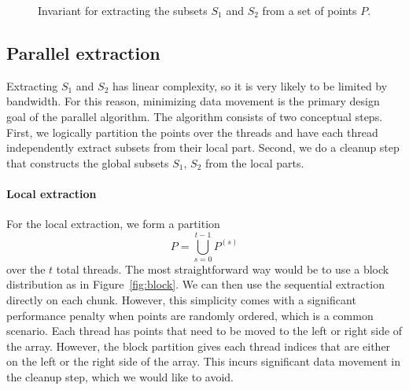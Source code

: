\documentclass[11pt,a4paper]{article}
\begin{document}
\begin{figure}[ht]
  \caption{Invariant for extracting the subsets $S_1$ and $S_2$ from a set of points $P$.}%
  \label{fig:invariant_qhull}%
\end{figure}

\subsection{Parallel extraction}
Extracting $S_1$ and $S_2$ has linear complexity, so it is very likely to be limited by bandwidth.
For this reason, minimizing data movement is the primary design goal of the parallel algorithm.
The algorithm consists of two conceptual steps.
First, we logically partition the points over the threads and have each thread independently extract subsets from their local part.
Second, we do a cleanup step that constructs the global subsets $S_1$, $S_2$ from the local parts.

\paragraph{Local extraction}
For the local extraction, we form a partition
\[
P = \bigcup\limits_{s = 0}^{t - 1} P^{(s)}
\]
over the $t$ total threads.
The most straightforward way would be to use a block distribution as in Figure~\ref{fig:block}.
We can then use the sequential extraction directly on each chunk.
However, this simplicity comes with a significant performance penalty when points are randomly ordered, which is a common scenario.
Each thread has points that need to be moved to the left or right side of the array.
However, the block partition gives each thread indices that are either on the left or the right side of the array.
This incurs significant data movement in the cleanup step, which we would like to avoid.
\end{document}
